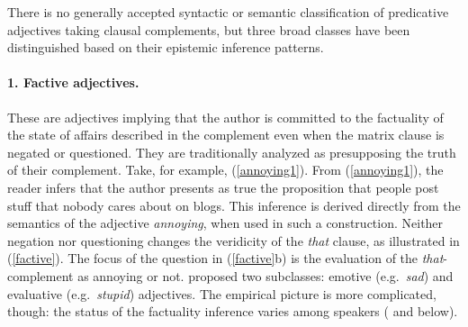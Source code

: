 \documentclass[10pt]{article}
\begin{document}
There is no generally accepted syntactic or semantic classification of predicative adjectives taking clausal complements, but three broad classes have been distinguished based on their epistemic inference patterns. 

\vspace{-.2in}
\paragraph{1. Factive adjectives.} These are adjectives  implying that the author is committed to the factuality of the state of affairs described in the complement even when the matrix clause is negated or questioned. They are traditionally analyzed as presupposing the truth of their complement.
Take, for example, (\ref{annoying1}).
 \vspace{-.1in}
 \vspace{-.1in}
From (\ref{annoying1}), the reader infers that the author presents as true the proposition that people post stuff that nobody cares about on blogs.
This inference is derived directly from the semantics of the adjective {\it annoying}, when used in such a construction. 
Neither negation nor questioning changes the veridicity of the \emph{that }clause, as illustrated in (\ref{factive}).  The focus of the question in (\ref{factive}b) is the evaluation of the \textit{that}-complement as annoying or not.
 \vspace{-.1in}
 \vspace{-.1in}
\cite{norrick:1978} proposed two subclasses: emotive (e.g.\ \textit{sad}) and evaluative (e.g.\ \textit{stupid}) adjectives. The empirical picture is more complicated, though: the status of the factuality inference varies among speakers (\cite{csli-gang-cssp13} and below).
\end{document}

